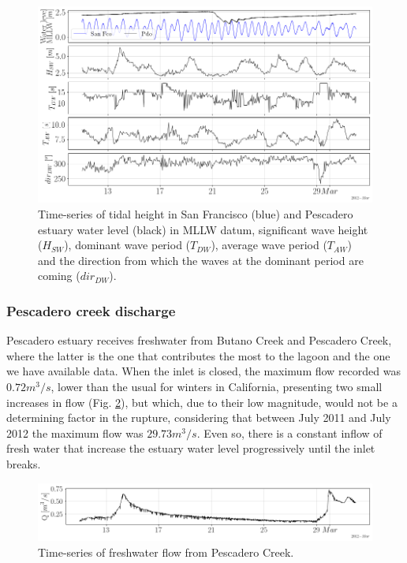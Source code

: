 \documentclass[11pt,letterpaper]{article}
\begin{document}
\begin{figure}[h!]
    \centering
    \includegraphics[width=\textwidth]{Imagenes/wave1.png}
    \caption{Time-series of tidal height in San Francisco (blue) and Pescadero estuary water level (black) in MLLW datum, significant wave height ($H_{SW}$), dominant wave period ($T_{DW}$), average wave period ($T_{AW}$) and the direction from which the waves at the dominant period are coming ($dir_{DW}$).}
    \label{fig:wave1}
\end{figure}

\subsubsection{Pescadero creek discharge}

Pescadero estuary receives freshwater from Butano Creek and Pescadero Creek, where the latter is the one that contributes the most to the lagoon and the one we have available data. When the inlet is closed, the maximum flow recorded was $0.72 m^3/s$, lower than the usual for winters in California, presenting two small increases in flow (Fig. \ref{fig:q}), but which, due to their low magnitude, would not be a determining factor in the rupture, considering that between July 2011 and July 2012 the maximum flow was $29.73 m^3/s$. Even so, there is a constant inflow of fresh water that increase the estuary water level progressively until the inlet breaks.  

\begin{figure}[h!]
    \centering
    \includegraphics[width=\textwidth]{Imagenes/Q.png}
    \caption{Time-series of freshwater flow from Pescadero Creek.}
    \label{fig:q}
\end{figure}
\end{document}

